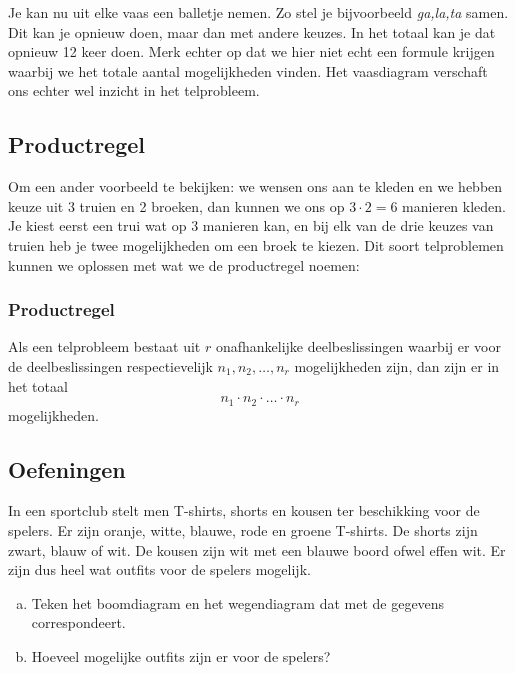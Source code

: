 \documentclass[12pt,a4paper,twoside]{article}
\begin{document}
Je kan nu uit elke vaas een balletje nemen. Zo stel je bijvoorbeeld {\em ga,la,ta} samen. Dit kan je opnieuw doen, maar dan met andere keuzes. In het totaal kan je dat opnieuw 12 keer doen. Merk echter op dat we hier niet echt een formule krijgen waarbij we het totale aantal mogelijkheden vinden. Het vaasdiagram verschaft ons echter wel inzicht in het telprobleem.

\subsection{Productregel}

Om een ander voorbeeld te bekijken: we wensen ons aan te kleden en we hebben keuze uit 3 truien en 2 broeken, dan kunnen we ons op $3 \cdot 2 = 6$ manieren kleden. Je kiest eerst een trui wat op 3 manieren kan, en bij elk van de drie keuzes van truien heb je twee mogelijkheden om een broek te kiezen. Dit soort telproblemen kunnen we oplossen met wat we de productregel noemen:

\subsubsection*{Productregel}
\begin{mdframed}
Als een telprobleem bestaat uit $r$ onafhankelijke deelbeslissingen waarbij er voor de deelbeslissingen respectievelijk $n_1, n_2, \ldots , n_r$ mogelijkheden zijn, dan zijn er in het totaal
\[n_1 \cdot n_2 \cdot \ldots \cdot n_r\]
mogelijkheden.
\end{mdframed}

\needspace{4cm}
\subsection{Oefeningen}

\begin{oefening}
In een sportclub stelt men T-shirts, shorts en kousen ter beschikking voor de spelers. Er zijn oranje, witte, blauwe, rode en groene T-shirts. De shorts zijn zwart, blauw of wit. De kousen zijn wit met een blauwe boord ofwel effen wit. Er zijn dus heel wat outfits voor de spelers mogelijk.

\begin{enumerate}[(a)]
\item Teken het boomdiagram en het wegendiagram dat met de gegevens correspondeert.
\item Hoeveel mogelijke outfits zijn er voor de spelers?
\end{enumerate}
\end{oefening}
\end{document}
